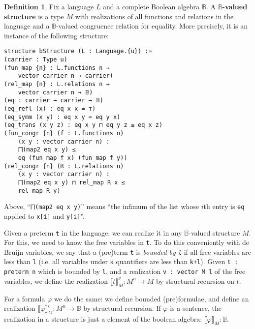 \documentclass[sigplan,10pt,review, anonymous]{acmart}
\newcommand{\B}{\mathbb{B}}
\newcommand{\lil}{\lstinline}
\theoremstyle{definition}
\newtheorem{defn}{Definition}[section]
\newcommand{\lil}{\lstinline}
\newcommand{\B}{\mathbb{B}}
\begin{document}
\begin{defn}\label{def-boolean-valued-structure}
  Fix a language $L$ and a complete Boolean algebra $\B$. A \textbf{$\B$-valued structure} is a type $M$ with realizations of all functions and relations in the language and a $\B$-valued congruence relation for equality. More precisely, it is an instance of the following structure:
  \begin{lstlisting}
structure bStructure (L : Language.{u}) :=
(carrier : Type u)
(fun_map {n} : L.functions n →
    vector carrier n → carrier)
(rel_map {n} : L.relations n →
    vector carrier n → 𝔹)
(eq : carrier → carrier → 𝔹)
(eq_refl (x) : eq x x = ⊤)
(eq_symm (x y) : eq x y = eq y x)
(eq_trans (x y z) : eq x y ⊓ eq y z ≤ eq x z)
(fun_congr {n} (f : L.functions n)
    (x y : vector carrier n) :
    ⨅(map2 eq x y) ≤
    eq (fun_map f x) (fun_map f y))
(rel_congr {n} (R : L.relations n)
    (x y : vector carrier n) :
    ⨅(map2 eq x y) ⊓ rel_map R x ≤
    rel_map R y)
\end{lstlisting}
Above, ``\lstinline{⨅(map2 eq x y)}'' means ``the infimum of the list whose $i$th entry is \lil{eq} applied to \lil{x[i]} and \lil{y[i]}''.
\end{defn}

Given a preterm \lil{t} in the language, we can realize it in any $\B$-valued structure $M$.
For this, we need to know the free variables in \lil{t}.
To do this conveniently with de Bruijn variables, we say that a (pre)term \lil{t} is \emph{bounded by \lil{l}} if all free variables are less than \lil{l} (i.e. all variables under \lil{k} quantifiers are less than \lil{k+l}).
Given \lil{t : preterm n} which is bounded by \lil{l}, and a realization \lil{v : vector M l} of the free variables, we define the realization $\llbracket t \rrbracket_M^v : M^n \to M$ by structural recursion on $t$.

For a formula $\varphi$ we do the same: we define bounded (pre)formulae, and define an realization $\llbracket \varphi \rrbracket_M^v : M^n \to \B$ by structural recursion.
If $\varphi$ is a sentence, the realization in a structure is just a element of the boolean algebra: $\llbracket \varphi \rrbracket_M : \B$.
\end{document}
